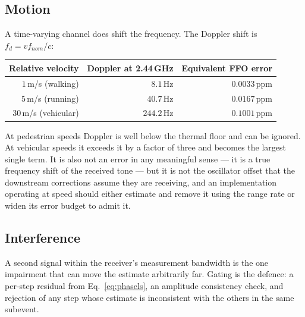 \documentclass[11pt,a4paper]{article}
\begin{document}
\subsection{Motion}

A time-varying channel does shift the frequency. The Doppler shift is $f_d = v f_{nom}/c$:

\begin{center}\small
\begin{tabular}{@{}rrr@{}}
\toprule
Relative velocity & Doppler at 2.44\,GHz & Equivalent FFO error \\
\midrule
$1$\,m/s (walking)   & $8.1$\,Hz   & $0.0033$\,ppm \\
$5$\,m/s (running)   & $40.7$\,Hz  & $0.0167$\,ppm \\
$30$\,m/s (vehicular)& $244.2$\,Hz & $0.1001$\,ppm \\
\bottomrule
\end{tabular}
\end{center}

At pedestrian speeds Doppler is well below the thermal floor and can be ignored. At vehicular speeds
it exceeds it by a factor of three and becomes the largest single term. It is also not an error in any
meaningful sense --- it is a true frequency shift of the received tone --- but it is not the
oscillator offset that the downstream corrections assume they are receiving, and an implementation
operating at speed should either estimate and remove it using the range rate or widen its error budget
to admit it.

\subsection{Interference}

A second signal within the receiver's measurement bandwidth is the one impairment that can move the
estimate arbitrarily far. Gating is the defence: a per-step residual from Eq.~\eqref{eq:phasels}, an
amplitude consistency check, and rejection of any step whose estimate is inconsistent with the others
in the same subevent.
\end{document}
